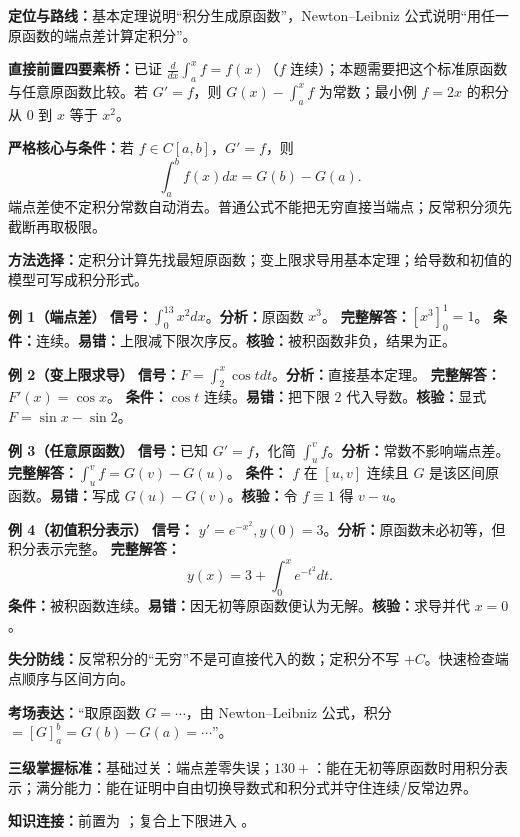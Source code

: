 \begin{knowledgeBox}
\textbf{定位与路线：}基本定理说明“积分生成原函数”，Newton--Leibniz 公式说明“用任一原函数的端点差计算定积分”。

\textbf{直接前置四要素桥：}已证 \(\frac d{dx}\int_a^xf=f(x)\)（\(f\) 连续）；本题需要把这个标准原函数与任意原函数比较。若 \(G'=f\)，则 \(G(x)-\int_a^xf\) 为常数；最小例 \(f=2x\) 的积分从 \(0\) 到 \(x\) 等于 \(x^2\)。

\textbf{严格核心与条件：}若 \(f\in C[a,b]\)，\(G'=f\)，则
\[
\int_a^bf(x)dx=G(b)-G(a).
\]
端点差使不定积分常数自动消去。普通公式不能把无穷直接当端点；反常积分须先截断再取极限。

\textbf{方法选择：}定积分计算先找最短原函数；变上限求导用基本定理；给导数和初值的模型可写成积分形式。

\textbf{例 1（端点差）}\quad
\textbf{信号：}\(\int_0^13x^2dx\)。\textbf{分析：}原函数 \(x^3\)。
\textbf{完整解答：}\([x^3]_0^1=1\)。
\textbf{条件：}连续。\textbf{易错：}上限减下限次序反。\textbf{核验：}被积函数非负，结果为正。

\textbf{例 2（变上限求导）}\quad
\textbf{信号：}\(F=\int_2^x\cos tdt\)。\textbf{分析：}直接基本定理。
\textbf{完整解答：} \(F'(x)=\cos x\)。
\textbf{条件：}\(\cos t\) 连续。\textbf{易错：}把下限 \(2\) 代入导数。\textbf{核验：}显式 \(F=\sin x-\sin2\)。

\textbf{例 3（任意原函数）}\quad
\textbf{信号：}已知 \(G'=f\)，化简 \(\int_u^vf\)。\textbf{分析：}常数不影响端点差。
\textbf{完整解答：}\(\int_u^vf=G(v)-G(u)\)。
\textbf{条件：} \(f\) 在 \([u,v]\) 连续且 \(G\) 是该区间原函数。\textbf{易错：}写成 \(G(u)-G(v)\)。\textbf{核验：}令 \(f\equiv1\) 得 \(v-u\)。

\textbf{例 4（初值积分表示）}\quad
\textbf{信号：} \(y'=e^{-x^2},y(0)=3\)。\textbf{分析：}原函数未必初等，但积分表示完整。
\textbf{完整解答：}
\[
y(x)=3+\int_0^xe^{-t^2}dt.
\]
\textbf{条件：}被积函数连续。\textbf{易错：}因无初等原函数便认为无解。\textbf{核验：}求导并代 \(x=0\)。

\textbf{失分防线：}反常积分的“无穷”不是可直接代入的数；定积分不写 \(+C\)。快速检查端点顺序与区间方向。

\textbf{考场表达：}“取原函数 \(G=\cdots\)，由 Newton--Leibniz 公式，积分 \(=[G]_a^b=G(b)-G(a)=\cdots\)”。

\textbf{三级掌握标准：}基础过关：端点差零失误；\(130+\)：能在无初等原函数时用积分表示；满分能力：能在证明中自由切换导数式和积分式并守住连续/反常边界。

\textbf{知识连接：}前置为 ；复合上下限进入 。
\end{knowledgeBox}

